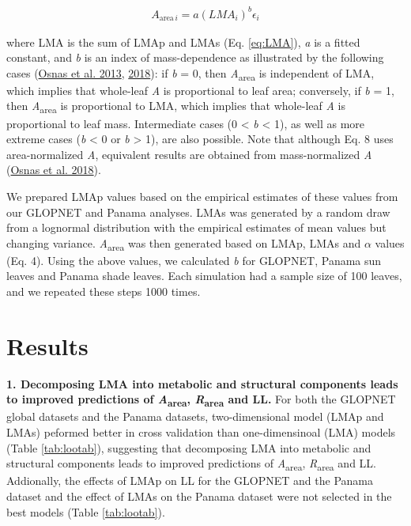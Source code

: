 \documentclass[
  12pt,
]{article}
\begin{document}
\begin{align}
A_{\mathrm{area} \, i} = a (LMA_i)^{b}\epsilon_i \tag{8}
\end{align}

where LMA is the sum of LMAp and LMAs (Eq. \eqref{eq:LMA}), \emph{a} is a fitted constant, and \emph{b} is an index of mass-dependence as illustrated by the following cases (\protect\hyperlink{ref-Osnas2013}{Osnas et al. 2013}, \protect\hyperlink{ref-Osnas2018}{2018}): if \emph{b} = 0, then \emph{A}\textsubscript{area} is independent of LMA, which implies that whole-leaf \emph{A} is proportional to leaf area; conversely, if \emph{b} = 1, then \emph{A}\textsubscript{area} is proportional to LMA, which implies that whole-leaf \emph{A} is proportional to leaf mass.
Intermediate cases (0 \textless{} \emph{b} \textless{} 1), as well as more extreme cases (\emph{b} \textless{} 0 or \emph{b} \textgreater{} 1), are also possible.
Note that although Eq. 8 uses area-normalized \emph{A}, equivalent results are obtained from mass-normalized \emph{A} (\protect\hyperlink{ref-Osnas2018}{Osnas et al. 2018}).

We prepared LMAp values based on the empirical estimates of these values from our GLOPNET and Panama analyses.
LMAs was generated by a random draw from a lognormal distribution with the empirical estimates of mean values but changing variance.
\emph{A}\textsubscript{area} was then generated based on LMAp, LMAs and \(\alpha\) values (Eq. 4).
Using the above values, we calculated \emph{b} for GLOPNET, Panama sun leaves and Panama shade leaves.
Each simulation had a sample size of 100 leaves, and we repeated these steps 1000 times.

\hypertarget{results}{%
\section{Results}\label{results}}

\textbf{1. Decomposing LMA into metabolic and structural components leads to improved predictions of \emph{A}\textsubscript{area}, \emph{R}\textsubscript{area} and LL.}
For both the GLOPNET global datasets and the Panama datasets, two-dimensional model (LMAp and LMAs) peformed better in cross validation than one-dimensinoal (LMA) models (Table \ref{tab:lootab}), suggesting that decomposing LMA into metabolic and structural components leads to improved predictions of \emph{A}\textsubscript{area}, \emph{R}\textsubscript{area} and LL.
Addionally, the effects of LMAp on LL for the GLOPNET and the Panama dataset and the effect of LMAs on the Panama dataset were not selected in the best models (Table \ref{tab:lootab}).
\end{document}
